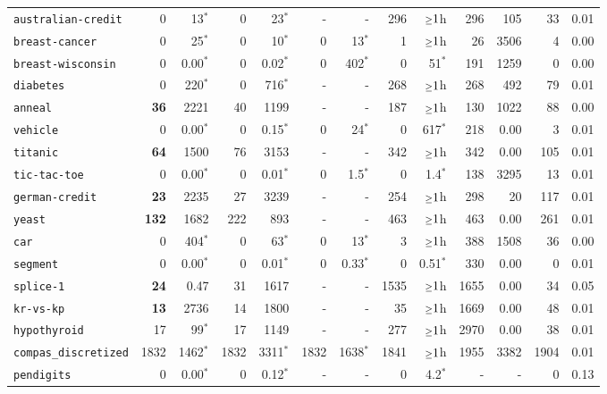 \begin{tabular}{lrrrrrrrrrrrr}
\texttt{australian-credit} & 0 & 13$^*$ & 0 & 23$^*$ & - & - & 296 & $\mathsmaller{\geq}1$h & 296 & 105 & 33 & 0.01\\
\texttt{breast-cancer} & 0 & 25$^*$ & 0 & 10$^*$ & 0 & 13$^*$ & 1 & $\mathsmaller{\geq}1$h & 26 & 3506 & 4 & 0.00\\
\texttt{breast-wisconsin} & 0 & 0.00$^*$ & 0 & 0.02$^*$ & 0 & 402$^*$ & 0 & 51$^*$ & 191 & 1259 & 0 & 0.00\\
\texttt{diabetes} & 0 & 220$^*$ & 0 & 716$^*$ & - & - & 268 & $\mathsmaller{\geq}1$h & 268 & 492 & 79 & 0.01\\
\texttt{anneal} & \textbf{36} & 2221 & 40 & 1199 & - & - & 187 & $\mathsmaller{\geq}1$h & 130 & 1022 & 88 & 0.00\\
\texttt{vehicle} & 0 & 0.00$^*$ & 0 & 0.15$^*$ & 0 & 24$^*$ & 0 & 617$^*$ & 218 & 0.00 & 3 & 0.01\\
\texttt{titanic} & \textbf{64} & 1500 & 76 & 3153 & - & - & 342 & $\mathsmaller{\geq}1$h & 342 & 0.00 & 105 & 0.01\\
\texttt{tic-tac-toe} & 0 & 0.00$^*$ & 0 & 0.01$^*$ & 0 & 1.5$^*$ & 0 & 1.4$^*$ & 138 & 3295 & 13 & 0.01\\
\texttt{german-credit} & \textbf{23} & 2235 & 27 & 3239 & - & - & 254 & $\mathsmaller{\geq}1$h & 298 & 20 & 117 & 0.01\\
\texttt{yeast} & \textbf{132} & 1682 & 222 & 893 & - & - & 463 & $\mathsmaller{\geq}1$h & 463 & 0.00 & 261 & 0.01\\
\texttt{car} & 0 & 404$^*$ & 0 & 63$^*$ & 0 & 13$^*$ & 3 & $\mathsmaller{\geq}1$h & 388 & 1508 & 36 & 0.00\\
\texttt{segment} & 0 & 0.00$^*$ & 0 & 0.01$^*$ & 0 & 0.33$^*$ & 0 & 0.51$^*$ & 330 & 0.00 & 0 & 0.01\\
\texttt{splice-1} & \textbf{24} & 0.47 & 31 & 1617 & - & - & 1535 & $\mathsmaller{\geq}1$h & 1655 & 0.00 & 34 & 0.05\\
\texttt{kr-vs-kp} & \textbf{13} & 2736 & 14 & 1800 & - & - & 35 & $\mathsmaller{\geq}1$h & 1669 & 0.00 & 48 & 0.01\\
\texttt{hypothyroid} & 17 & 99$^*$ & 17 & 1149 & - & - & 277 & $\mathsmaller{\geq}1$h & 2970 & 0.00 & 38 & 0.01\\
\texttt{compas\_discretized} & 1832 & 1462$^*$ & 1832 & 3311$^*$ & 1832 & 1638$^*$ & 1841 & $\mathsmaller{\geq}1$h & 1955 & 3382 & 1904 & 0.01\\
\texttt{pendigits} & 0 & 0.00$^*$ & 0 & 0.12$^*$ & - & - & 0 & 4.2$^*$ & - & - & 0 & 0.13\\

\end{tabular}
